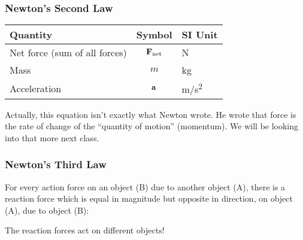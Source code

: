 \documentclass[12pt,compress,aspectratio=169]{beamer}
\newcommand{\mb}[1]{\ensuremath\mathbf{#1}}
\newcommand{\eq}[2]{\vspace{#1}{\Large\begin{displaymath}#2\end{displaymath}}}
\begin{document}
\begin{frame}
  \frametitle{Newton's Second Law}
  \begin{center}
  \end{center}

  \eq{-.2in}{
    \boxed{\mb{F}_{\textrm{net}}=\Sigma\mb{F}=m\mb{a}}
  }
  
  \begin{center}
    \begin{tabular}{l|c|l}
      \rowcolor{pink}
      \textbf{Quantity} & \textbf{Symbol} & \textbf{SI Unit} \\ \hline
      Net force (sum of all forces)  & $\mb{F}_{\textrm{net}}$ & \si{N}\\
      Mass         & $m$       & \si{kg}\\
      Acceleration & $\mb{a}$  & \si{m/s^2}\\
    \end{tabular}
  \end{center}

  Actually, this equation isn't exactly what Newton wrote. He wrote that force
  is the rate of change of the ``quantity of motion'' (momentum). We will be
  looking into that more next class.
\end{frame}


\begin{frame}
  \frametitle{Newton's Third Law}

  \begin{center}
  \end{center}
 
  For every action force on an object (B) due to another object (A), there is a
  reaction force which is equal in magnitude but opposite in direction, on
  object (A), due to object (B):

  \eq{-.2in}{
    \boxed{\mb{F}_{\textrm{A on B}} = -\mb{F}_{\textrm{B on A}}}
  }
  
  The reaction forces act on different objects!
\end{frame}
\end{document}
